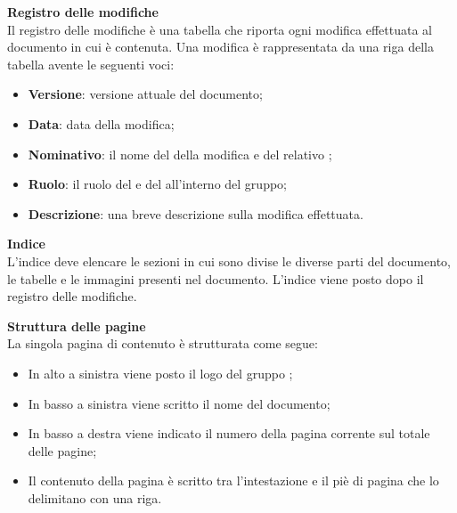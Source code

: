 \textbf{Registro delle modifiche}\\
Il registro delle modifiche è una tabella che riporta ogni modifica effettuata al documento in cui è contenuta. Una modifica è rappresentata da una riga della tabella avente le seguenti voci:
\begin{itemize}

	\item \textbf{Versione}: versione attuale del documento;
	
	\item \textbf{Data}: data della modifica;
	
	\item \textbf{Nominativo}: il nome del  della modifica e del relativo ;
	
	\item \textbf{Ruolo}: il ruolo del  e del  all'interno del gruppo;

	\item \textbf{Descrizione}: una breve descrizione sulla modifica effettuata.
\end{itemize}

\textbf{Indice}\\
L'indice deve elencare le sezioni in cui sono divise le diverse parti del documento, le tabelle e le immagini presenti nel documento. L'indice viene posto dopo il registro delle modifiche.

\mbox{}

\textbf{Struttura delle pagine}\\
La singola pagina di contenuto è strutturata come segue:
\begin{itemize}

	\item In alto a sinistra viene posto il logo del gruppo \Gruppo{};
	
	\item In basso a sinistra viene scritto il nome del documento;
	
	\item In basso a destra viene indicato il numero della pagina corrente sul totale delle pagine;
	
	\item Il contenuto della pagina è scritto tra l'intestazione e il piè di pagina che lo delimitano con una riga.
\end{itemize}

\mbox{}

